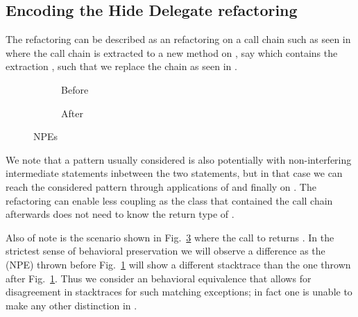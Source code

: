 \subsection{Encoding the Hide Delegate refactoring}\label{sec:hideDelegate}

The  refactoring can be described as an  refactoring on a call chain such as seen in 
where the call chain is extracted to a new method on , say  which contains the extraction , such that we replace the chain as seen in .

\begin{figure}[tbp]
  \centering
  \begin{subfigure}{.3\linewidth}
    
    \caption{Before}
    \label{fig:hd-npe-before}
  \end{subfigure}
  \begin{subfigure}{.3\linewidth}
    
    \caption{After}
    \label{fig:hd-npe-after}    
  \end{subfigure}
  \caption{NPEs}
  \label{fig:NPEs}
\end{figure}

We note that a pattern usually considered is also  potentially with non-interfering intermediate statements inbetween the two statements,
but in that case we can reach the considered pattern through applications of  and finally  on .
The refactoring can enable less coupling as the class that contained the call chain afterwards does not need to know the return type of .

Also of note is the scenario shown in Fig.~\ref{fig:NPEs} where the call to  returns . In the strictest sense of behavioral preservation
we will observe a difference as the  (NPE) thrown before Fig.~\ref{fig:hd-npe-before} will show a different stacktrace than the one thrown after Fig.~\ref{fig:hd-npe-before}.
Thus we consider an behavioral equivalence that allows for disagreement in stacktraces for such matching exceptions; in fact one is unable to make any other distinction in \Refinity{}.


